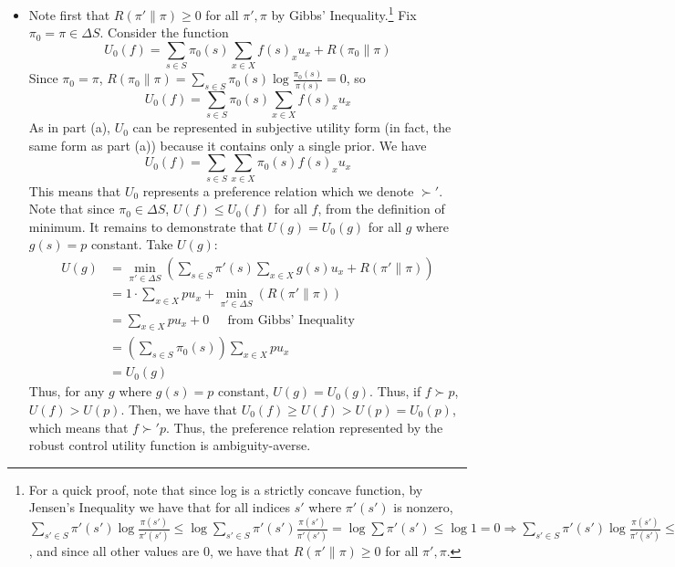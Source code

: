 \documentclass[12pt]{article}
\begin{document}
\begin{itemize}
    \item[(b)] Note first that $R(\pi' \| \pi) \ge 0$ for all $\pi',\pi$ by Gibbs' Inequality.\footnote{For a quick proof, note that since log is a strictly concave function, by Jensen's Inequality we have that for all indices $s'$ where $\pi'(s')$ is nonzero, $\sum_{s' \in S} \pi'(s') \log \frac{\pi(s')}{\pi'(s')} \le \log \sum_{s' \in S} \pi'(s') \frac{\pi(s')}{\pi'(s')} = \log \sum \pi'(s') \le \log 1 = 0 \Rightarrow \sum_{s' \in S} \pi'(s') \log \frac{\pi(s')}{\pi'(s')} \le 0 \Rightarrow \sum_{s' \in S} \pi'(s') \log \frac{\pi'(s')}{\pi(s')} \ge 0$, and since all other values are 0, we have that $R(\pi' \| \pi) \ge 0$ for all $\pi',\pi$.} Fix $\pi_0 = \pi \in \Delta S$. Consider the function
    \[
    U_0(f) = \sum_{s \in S} \pi_0(s) \sum_{x \in X} f(s)_x u_x + R(\pi_0 \|\pi)
    \]
    Since $\pi_0 = \pi$, $R(\pi_0 \| \pi) = \sum_{s \in S} \pi_0(s) \log \frac{\pi_0(s)}{\pi(s)} = 0$, so
    \[
    U_0(f) = \sum_{s \in S} \pi_0(s) \sum_{x \in X} f(s)_x u_x
    \]
    As in part (a), $U_0$ can be represented in subjective utility form (in fact, the same form as part (a)) because it contains only a single prior. We have
    \[
    U_0(f) = \sum_{s\in S} \sum_{x \in X} \pi_0(s) f(s)_x u_x
    \]
    This means that $U_0$ represents a preference relation which we denote $\succ'$. Note that since $\pi_0 \in \Delta S$, $U(f) \le U_0(f)$ for all $f$, from the definition of minimum. It remains to demonstrate that $U(g) = U_0(g)$ for all $g$ where $g(s) = p$ constant. Take $U(g)$:
    \begin{align*}
    U(g) &= \min_{\pi' \in \Delta S} \left( \sum_{s \in S} \pi'(s) \sum_{x \in X} g(s) u_x + R(\pi' \| \pi) \right) \\
    &= 1 \cdot \sum_{x \in X} pu_x + \min_{\pi' \in \Delta S} \left( R(\pi' \| \pi) \right) \\
    &= \sum_{x \in X} pu_x + 0 \;\;\;\;\text{ from Gibbs' Inequality} \\
    &= \left(\sum_{s \in S} \pi_0(s) \right) \sum_{x \in X} pu_x  \\
    &= U_0(g)
    \end{align*}
    Thus, for any $g$ where $g(s) = p$ constant, $U(g) = U_0(g)$. Thus, if $f \succ p$, $U(f) > U(p)$. Then, we have that $U_0(f) \ge U(f) > U(p) = U_0(p)$, which means that $f \succ' p$. Thus, the preference relation represented by the robust control utility function is ambiguity-averse.


\end{itemize}
\end{document}
